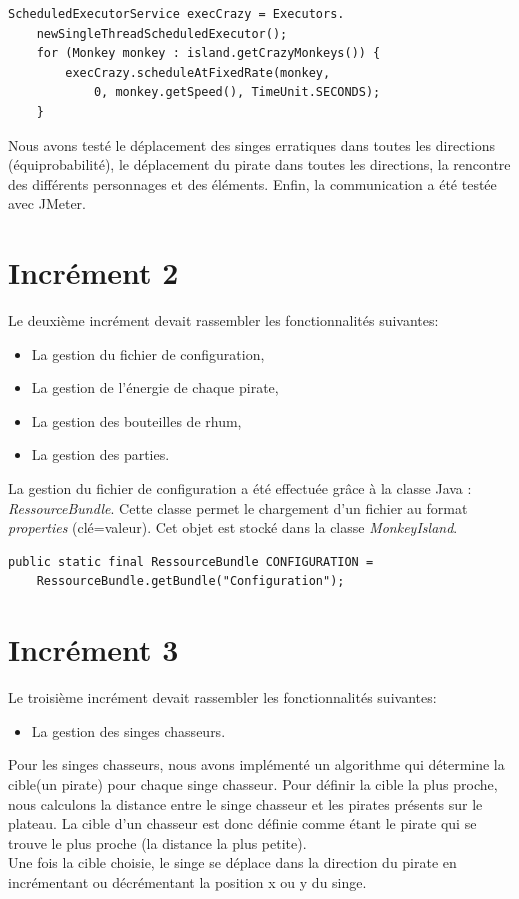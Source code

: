 \begin{lstlisting}
ScheduledExecutorService execCrazy = Executors.
	newSingleThreadScheduledExecutor();
    for (Monkey monkey : island.getCrazyMonkeys()) {
    	execCrazy.scheduleAtFixedRate(monkey, 
    		0, monkey.getSpeed(), TimeUnit.SECONDS);
    }
\end{lstlisting}

Nous avons testé le déplacement des singes erratiques dans toutes les directions (équiprobabilité), le déplacement du pirate dans toutes les directions, la rencontre des différents personnages et des éléments. Enfin, la communication a été testée avec JMeter.

\section{Incrément 2}
Le deuxième incrément devait rassembler les fonctionnalités suivantes:\\

\begin{itemize}
\item La gestion du fichier de configuration,
\item La gestion de l'énergie de chaque pirate,
\item La gestion des bouteilles de rhum,
\item La gestion des parties.\\
\end{itemize}

La gestion du fichier de configuration a été effectuée grâce à la classe Java : \emph{RessourceBundle}. Cette classe permet le chargement d'un fichier au format \emph{properties} (clé=valeur). Cet objet est stocké dans la classe \emph{MonkeyIsland}.

\begin{lstlisting}
public static final RessourceBundle CONFIGURATION = 
	RessourceBundle.getBundle("Configuration");
\end{lstlisting}

\section{Incrément 3}

Le troisième incrément devait rassembler les fonctionnalités suivantes:\\

\begin{itemize}
\item La gestion des singes chasseurs.\\
\end{itemize}

Pour les singes chasseurs, nous avons implémenté un algorithme qui détermine la cible(un pirate) pour chaque singe chasseur. Pour définir la cible la plus proche, nous calculons la distance entre le singe chasseur et les pirates présents sur le plateau. La cible d'un chasseur est donc définie comme étant le pirate qui se trouve le plus proche (la distance la plus petite).\\

Une fois la cible choisie, le singe se déplace dans la direction du pirate en incrémentant ou décrémentant la position x ou y du singe.

